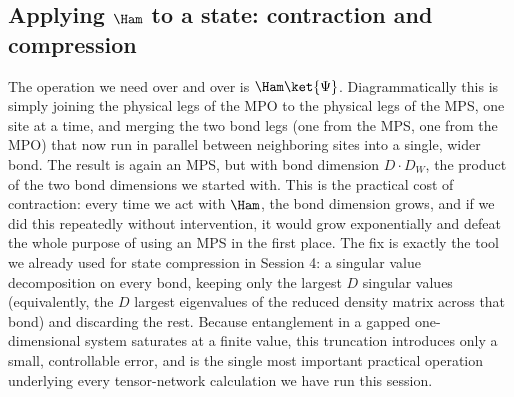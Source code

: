 \documentclass[all_sessions.tex]{subfiles}
\begin{document}
\subsection{Applying $\Ham$ to a state: contraction and compression}
The operation we need over and over is $\Ham\ket{\Psi}$. Diagrammatically this is simply joining the
physical legs of the MPO to the physical legs of the MPS, one site at a time, and merging the two
bond legs (one from the MPS, one from the MPO) that now run in parallel between neighboring sites
into a single, wider bond. The result is again an MPS, but with bond dimension $D\cdot D_W$, the
product of the two bond dimensions we started with. This is the practical cost of contraction: every
time we act with $\Ham$, the bond dimension grows, and if we did this repeatedly without
intervention, it would grow exponentially and defeat the whole purpose of using an MPS in the first
place. The fix is exactly the tool we already used for state compression in Session 4: a singular
value decomposition on every bond, keeping only the largest $D$ singular values (equivalently, the
$D$ largest eigenvalues of the reduced density matrix across that bond) and discarding the rest.
Because entanglement in a gapped one-dimensional system saturates at a finite value, this truncation
introduces only a small, controllable error, and is the single most important practical operation
underlying every tensor-network calculation we have run this session.
\end{document}
